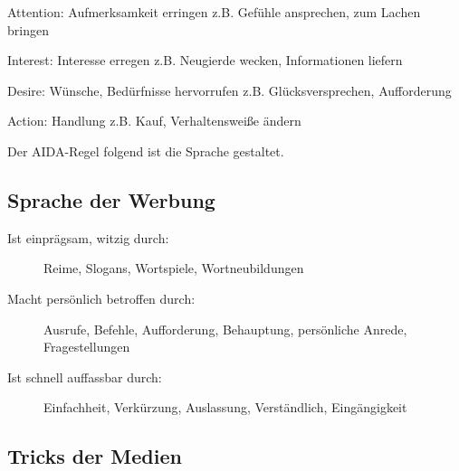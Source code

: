 \begin{eqlist}
	\item[Attention:] Aufmerksamkeit erringen
					z.B. Gefühle ansprechen, zum Lachen bringen
	\item[Interest:] Interesse erregen
					z.B. Neugierde wecken, Informationen liefern
	\item[Desire:] Wünsche, Bedürfnisse hervorrufen
					z.B. Glücksversprechen, Aufforderung
	\item[Action:] Handlung
					z.B. Kauf, Verhaltensweiße ändern
\end{eqlist}

Der AIDA-Regel folgend ist die Sprache gestaltet.

\subsection{Sprache der Werbung}
\begin{description}
	\item[Ist einprägsam, witzig durch:] Reime, Slogans, Wortspiele, Wortneubildungen
	\item[Macht persönlich betroffen durch:] Ausrufe, Befehle, Aufforderung, Behauptung, persönliche
		Anrede, Fragestellungen
	\item[Ist schnell auffassbar durch:] Einfachheit, Verkürzung, Auslassung, Verständlich,
		Eingängigkeit
\end{description}


\subsection{Tricks der Medien}
